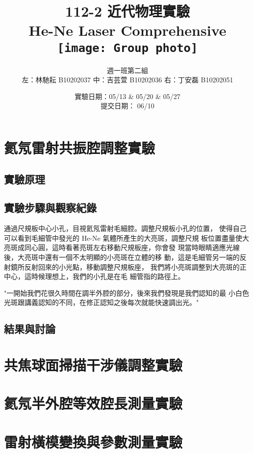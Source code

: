 \documentclass[10pt]{report}
\title{112-2 近代物理實驗\\He-Ne Laser Comprehensive\\\vspace{1cm}
\texttt{[image: Group photo]}
}
\author{週一班第二組 \\ 左：林馳耘 B10202037 中：吉芸萱 B10202036 右：丁安磊 B10202051}
\date{實驗日期：05/13 \& 05/20 \& 05/27\\提交日期： 06/10}
\begin{document}
\renewcommand{\figurename}{圖}
\renewcommand{\tablename}{表}
\newcommand{\br}[1]{\left(#1\right)}
\renewcommand{\vb}[1]{\boldsymbol{\mathbf{#1}}} %

\maketitle

\tableofcontents

\clearpage

\chapter{氦氖雷射共振腔調整實驗}

\section{實驗原理}

\section{實驗步驟與觀察紀錄}

通過尺規板中心小孔，目視氦氖雷射毛細腔。調整尺規板小孔的位置，
使得自己可以看到毛細管中發光的 He-Ne 氣體所產生的大亮斑，調整尺規
板位置盡量使大亮斑成同心圓，這時看著亮斑左右移動尺規板座，你會發
現當時眼睛適應光線後，大亮斑中還有一個不太明顯的小亮斑在立體的移
動，這是毛細管另一端的反射鏡所反射回來的小光點，移動調整尺規板座，
我們將小亮斑調整到大亮斑的正中心，這時候理想上，我們的小孔是在毛
細管指的路徑上。

"一開始我們花很久時間在調半外腔的部分，後來我們發現是我們認知的最
小白色光斑跟講義認知的不同，在修正認知之後每次就能快速調出光。"

\section{結果與討論}

\chapter{共焦球面掃描干涉儀調整實驗}

\chapter{氦氖半外腔等效腔長測量實驗}

\chapter{雷射橫模變換與參數測量實驗}
\end{document}
